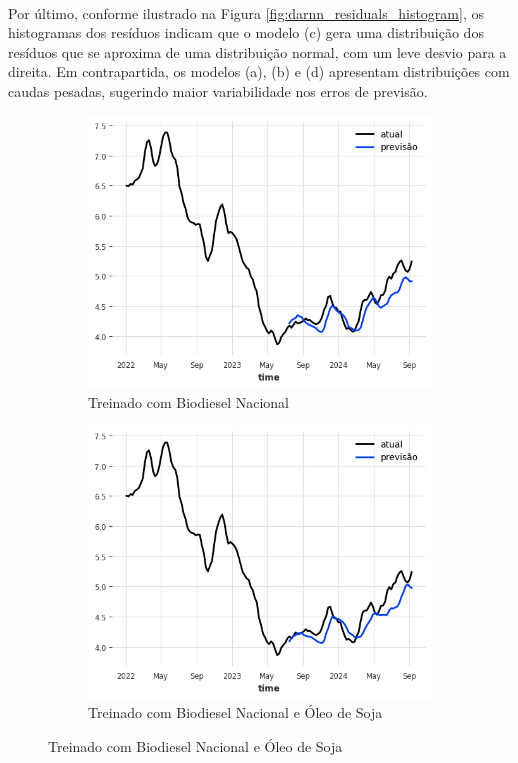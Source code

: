 \paragraph{} Por último, conforme ilustrado na Figura \ref{fig:darnn_residuals_histogram}, os histogramas dos resíduos indicam que o modelo (c) gera uma distribuição dos resíduos que se aproxima de uma distribuição normal, com um leve desvio para a direita. Em contrapartida, os modelos (a), (b) e (d) apresentam distribuições com caudas pesadas, sugerindo maior variabilidade nos erros de previsão.
\begin{figure}[htbp]
	\centering
	\begin{subfigure}[b]{0.45\textwidth}
		\centering
		\includegraphics[width=\textwidth]{figuras/darnn_brasil_plot.png} %
		\caption{Treinado com Biodiesel Nacional \newline}
		\label{fig:darnn_brasil_plot}
	\end{subfigure}
	\hfill
	\begin{subfigure}[b]{0.45\textwidth}
		\centering
		\includegraphics[width=\textwidth]{figuras/darnn_brasil_oil_plot.png} %
		\caption{Treinado com Biodiesel Nacional e Óleo de Soja}
		\label{fig:darnn_brasil_oil_plot}
	\end{subfigure}


\end{figure}
